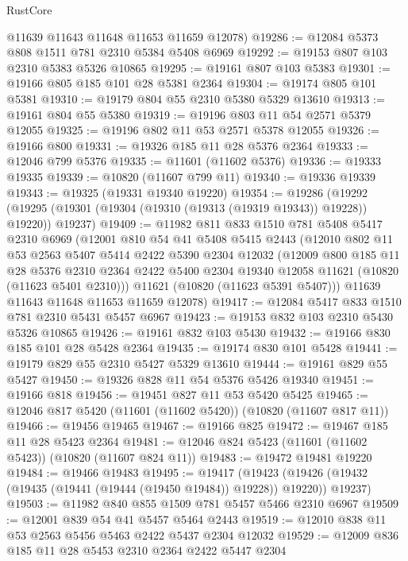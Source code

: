 \begin{lexlean}{RustCore}
\begin{coremodule}
      @11639
      @11643
      @11648
      @11653
      @11659
      @12078)
@19286 := @12084 @5373 @808 @1511 @781 @2310 @5384 @5408 @6969
@19292 := @19153 @807 @103 @2310 @5383 @5326 @10865
@19295 := @19161 @807 @103 @5383
@19301 := @19166 @805 @185 @101 @28 @5381 @2364
@19304 := @19174 @805 @101 @5381
@19310 := @19179 @804 @55 @2310 @5380 @5329 @13610
@19313 := @19161 @804 @55 @5380
@19319 := @19196 @803 @11 @54 @2571 @5379 @12055
@19325 := @19196 @802 @11 @53 @2571 @5378 @12055
@19326 := @19166 @800
@19331 := @19326 @185 @11 @28 @5376 @2364
@19333 := @12046 @799 @5376
@19335 := @11601 (@11602 @5376)
@19336 := @19333 @19335
@19339 := @10820 (@11607 @799 @11)
@19340 := @19336 @19339
@19343 := @19325 (@19331 @19340 @19220)
@19354 := @19286
    (@19292 (@19295 (@19301 (@19304 (@19310 (@19313 (@19319 @19343)) @19228)) @19220)) @19237)
@19409 := @11982
    @811
    @833
    @1510
    @781
    @5408
    @5417
    @2310
    @6969
    (@12001
      @810
      @54
      @41
      @5408
      @5415
      @2443
      (@12010
        @802
        @11
        @53
        @2563
        @5407
        @5414
        @2422
        @5390
        @2304
        @12032
        (@12009
          @800
          @185
          @11
          @28
          @5376
          @2310
          @2364
          @2422
          @5400
          @2304
          @19340
          @12058
          @11621
          (@10820 (@11623 @5401 @2310)))
        @11621
        (@10820 (@11623 @5391 @5407)))
      @11639
      @11643
      @11648
      @11653
      @11659
      @12078)
@19417 := @12084 @5417 @833 @1510 @781 @2310 @5431 @5457 @6967
@19423 := @19153 @832 @103 @2310 @5430 @5326 @10865
@19426 := @19161 @832 @103 @5430
@19432 := @19166 @830 @185 @101 @28 @5428 @2364
@19435 := @19174 @830 @101 @5428
@19441 := @19179 @829 @55 @2310 @5427 @5329 @13610
@19444 := @19161 @829 @55 @5427
@19450 := @19326 @828 @11 @54 @5376 @5426 @19340
@19451 := @19166 @818
@19456 := @19451 @827 @11 @53 @5420 @5425
@19465 := @12046 @817 @5420 (@11601 (@11602 @5420)) (@10820 (@11607 @817 @11))
@19466 := @19456 @19465
@19467 := @19166 @825
@19472 := @19467 @185 @11 @28 @5423 @2364
@19481 := @12046 @824 @5423 (@11601 (@11602 @5423)) (@10820 (@11607 @824 @11))
@19483 := @19472 @19481 @19220
@19484 := @19466 @19483
@19495 := @19417
    (@19423 (@19426 (@19432 (@19435 (@19441 (@19444 (@19450 @19484)) @19228)) @19220)) @19237)
@19503 := @11982 @840 @855 @1509 @781 @5457 @5466 @2310 @6967
@19509 := @12001 @839 @54 @41 @5457 @5464 @2443
@19519 := @12010 @838 @11 @53 @2563 @5456 @5463 @2422 @5437 @2304 @12032
@19529 := @12009 @836 @185 @11 @28 @5453 @2310 @2364 @2422 @5447 @2304

\end{coremodule}
\end{lexlean}
